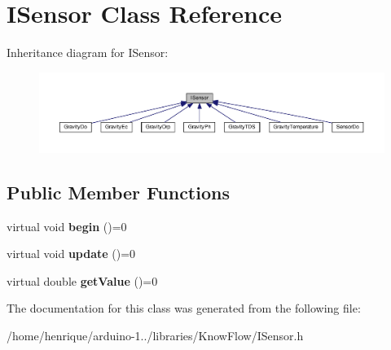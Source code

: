 \hypertarget{class_i_sensor}{}\section{I\+Sensor Class Reference}
\label{class_i_sensor}


Inheritance diagram for I\+Sensor\+:\nopagebreak
\begin{figure}[H]
\begin{center}
\leavevmode
\includegraphics[width=350pt]{class_i_sensor__inherit__graph}
\end{center}
\end{figure}
\subsection*{Public Member Functions}
\begin{DoxyCompactItemize}
\item 
virtual void {\bfseries begin} ()=0\hypertarget{class_i_sensor_a88d0363e9bb83378090a021d634e03f7}{}\label{class_i_sensor_a88d0363e9bb83378090a021d634e03f7}

\item 
virtual void {\bfseries update} ()=0\hypertarget{class_i_sensor_a53606e8b3764eda1b4b0c00aa983e264}{}\label{class_i_sensor_a53606e8b3764eda1b4b0c00aa983e264}

\item 
virtual double {\bfseries get\+Value} ()=0\hypertarget{class_i_sensor_a9972b325fb329e6eaefd79e562ad7776}{}\label{class_i_sensor_a9972b325fb329e6eaefd79e562ad7776}

\end{DoxyCompactItemize}


The documentation for this class was generated from the following file\+:\begin{DoxyCompactItemize}
\item 
/home/henrique/arduino-\/1../libraries/\+Know\+Flow/I\+Sensor.\+h\end{DoxyCompactItemize}
